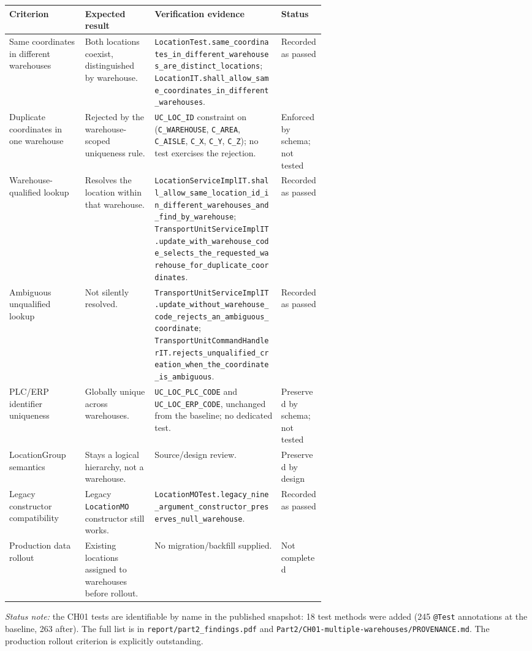 \documentclass[11pt,a4paper]{article}
\newcommand{\code}[1]{\nolinkurl{#1}}
\begin{document}
\begin{tabularx}{\linewidth}{@{}P{0.24\linewidth}P{0.22\linewidth}YP{0.14\linewidth}@{}}
\toprule
Criterion & Expected result & Verification evidence & Status\\
\midrule
Same coordinates in different warehouses & Both locations coexist, distinguished by warehouse. & \code{LocationTest.same_coordinates_in_different_warehouses_are_distinct_locations}; \code{LocationIT.shall_allow_same_coordinates_in_different_warehouses}. & Recorded as passed\\
Duplicate coordinates in one warehouse & Rejected by the warehouse-scoped uniqueness rule. & \code{UC_LOC_ID} constraint on (\code{C_WAREHOUSE}, \code{C_AREA}, \code{C_AISLE}, \code{C_X}, \code{C_Y}, \code{C_Z}); no test exercises the rejection. & Enforced by schema; not tested\\
Warehouse-qualified lookup & Resolves the location within that warehouse. & \code{LocationServiceImplIT.shall_allow_same_location_id_in_different_warehouses_and_find_by_warehouse}; \code{TransportUnitServiceImplIT.update_with_warehouse_code_selects_the_requested_warehouse_for_duplicate_coordinates}. & Recorded as passed\\
Ambiguous unqualified lookup & Not silently resolved. & \code{TransportUnitServiceImplIT.update_without_warehouse_code_rejects_an_ambiguous_coordinate}; \code{TransportUnitCommandHandlerIT.rejects_unqualified_creation_when_the_coordinate_is_ambiguous}. & Recorded as passed\\
PLC/ERP identifier uniqueness & Globally unique across warehouses. & \code{UC_LOC_PLC_CODE} and \code{UC_LOC_ERP_CODE}, unchanged from the baseline; no dedicated test. & Preserved by schema; not tested\\
LocationGroup semantics & Stays a logical hierarchy, not a warehouse. & Source/design review. & Preserved by design\\
Legacy constructor compatibility & Legacy \code{LocationMO} constructor still works. & \code{LocationMOTest.legacy_nine_argument_constructor_preserves_null_warehouse}. & Recorded as passed\\
Production data rollout & Existing locations assigned to warehouses before rollout. & No migration/backfill supplied. & Not completed\\
\bottomrule
\end{tabularx}
\textit{Status note:} the CH01 tests are identifiable by name in the published snapshot: 18 test methods were added (245 \code{@Test} annotations at the baseline, 263 after). The full list is in \code{report/part2_findings.pdf} and \code{Part2/CH01-multiple-warehouses/PROVENANCE.md}. The production rollout criterion is explicitly outstanding.
\end{document}
